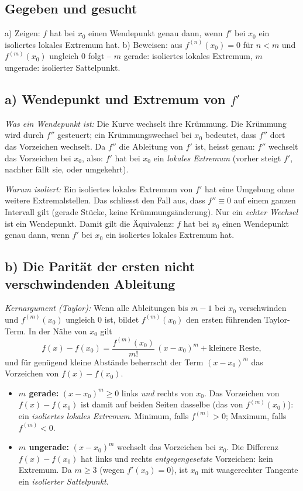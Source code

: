 
\subsection*{Gegeben und gesucht}
a) Zeigen: $f$ hat bei $x_0$ einen Wendepunkt genau dann, wenn $f'$ bei
$x_0$ ein isoliertes lokales Extremum hat. b) Beweisen: aus
$f^{(n)}(x_0)=0$ für $n<m$ und $f^{(m)}(x_0)$ ungleich $0$ folgt -- $m$
gerade: isoliertes lokales Extremum, $m$ ungerade: isolierter
Sattelpunkt.

\subsection*{a) Wendepunkt und Extremum von $f'$}
\emph{Was ein Wendepunkt ist:} Die Kurve wechselt ihre Krümmung. Die
Krümmung wird durch $f''$ gesteuert; ein Krümmungswechsel bei $x_0$
bedeutet, dass $f''$ dort das Vorzeichen wechselt. Da $f''$ die Ableitung
von $f'$ ist, heisst genau: $f''$ wechselt das Vorzeichen bei $x_0$,
also: $f'$ hat bei $x_0$ ein \emph{lokales Extremum} (vorher steigt $f'$, nachher
fällt sie, oder umgekehrt).

\emph{Warum \emph{isoliert}:} Ein isoliertes lokales Extremum von $f'$ hat
eine Umgebung ohne weitere Extremalstellen. Das schliesst den Fall aus, dass
$f''\equiv0$ auf einem ganzen Intervall gilt (gerade Stücke, keine
Krümmungsänderung). Nur ein \emph{echter Wechsel} ist ein Wendepunkt. Damit
gilt die Äquivalenz: $f$ hat bei $x_0$ einen Wendepunkt genau dann, wenn
$f'$ bei $x_0$ ein isoliertes lokales Extremum hat.

\subsection*{b) Die Parität der ersten nicht verschwindenden Ableitung}
\emph{Kernargument (Taylor):} Wenn alle Ableitungen bis $m-1$ bei $x_0$
verschwinden und $f^{(m)}(x_0)$ ungleich $0$ ist, bildet $f^{(m)}(x_0)$
den ersten führenden Taylor-Term. In der Nähe von $x_0$ gilt
\begin{equation*}
  f(x)-f(x_0)
  =\frac{f^{(m)}(x_0)}{m!}\,(x-x_0)^m+\text{kleinere Reste},
\end{equation*}
und für genügend kleine Abstände beherrscht der Term $(x-x_0)^m$ das
Vorzeichen von $f(x)-f(x_0)$.

\begin{itemize}
  \item \textbf{$m$ gerade:} $(x-x_0)^m\ge0$ links \emph{und} rechts von
        $x_0$. Das Vorzeichen von $f(x)-f(x_0)$ ist damit auf beiden
        Seiten dasselbe (das von $f^{(m)}(x_0)$): ein \emph{isoliertes
        lokales Extremum}. Minimum, falls $f^{(m)}>0$; Maximum, falls
        $f^{(m)}<0$.
  \item \textbf{$m$ ungerade:} $(x-x_0)^m$ wechselt das Vorzeichen bei
        $x_0$. Die Differenz $f(x)-f(x_0)$ hat links und rechts
        \emph{entgegengesetzte} Vorzeichen: kein Extremum. Da $m\ge3$
        (wegen $f'(x_0)=0$), ist $x_0$ mit waagerechter Tangente ein
        \emph{isolierter Sattelpunkt}.
\end{itemize}

